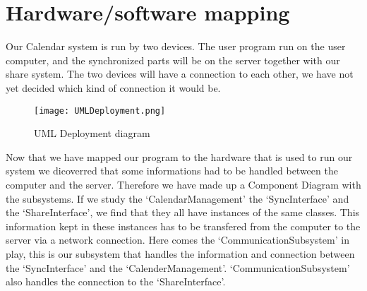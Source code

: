 \section{Hardware/software mapping}

Our Calendar system is run by two devices. The user program run on the user computer, and the synchronized parts will be on the server together with our share system. The two devices will have a connection to each other, we have not yet decided which kind of connection it would be.

\begin{figure}[h]
\centering
\texttt{[image: UMLDeployment.png]}
\caption{UML Deployment diagram \label{overflow}}
\label{figur:UMLDeployment}
\end{figure}

Now that we have mapped our program to the hardware that is used to run our system we dicoverred that some informations had to be handled between the computer and the server. Therefore we have made up a Component Diagram with the subsystems. If we study the ‘CalendarManagement’ the ‘SyncInterface’ and the ‘ShareInterface’, we find that they all have instances of the same classes. This information kept in these instances has to be transfered from the computer to the server via a network connection. Here comes the ‘CommunicationSubsystem’ in play, this is our subsystem that handles the information and connection between the ‘SyncInterface’ and the ‘CalenderManagement’. ‘CommunicationSubsystem’ also handles the connection to the ‘ShareInterface’.